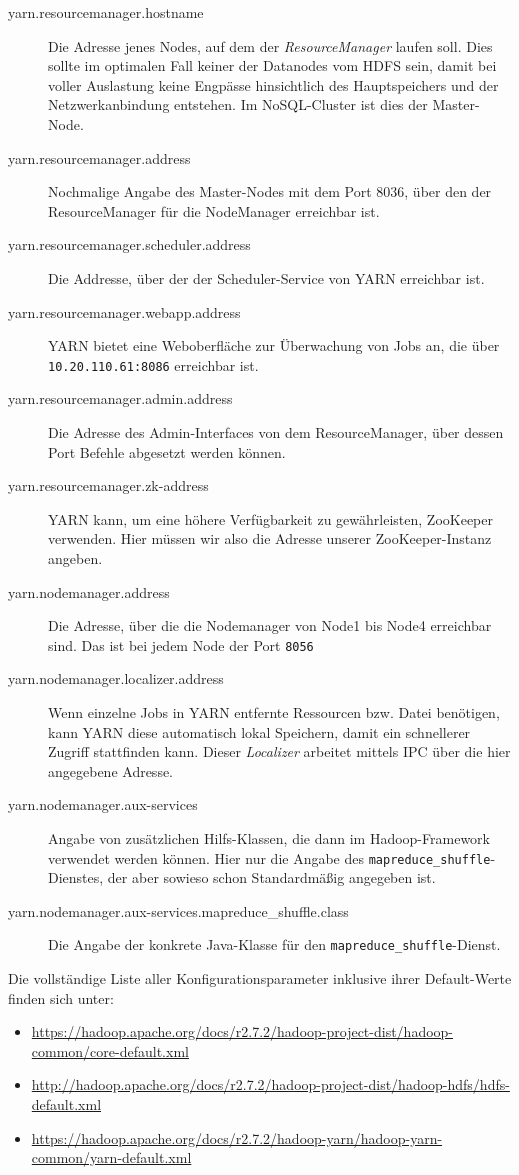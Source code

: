 \begin{description}
	\item[yarn.resourcemanager.hostname] Die Adresse jenes Nodes, auf dem der \textit{ResourceManager} laufen soll.
	Dies sollte im optimalen Fall keiner der Datanodes vom HDFS sein, damit bei voller Auslastung keine Engpässe hinsichtlich
	des Hauptspeichers und der Netzwerkanbindung entstehen. Im NoSQL-Cluster ist dies der Master-Node.
	\item[yarn.resourcemanager.address] Nochmalige Angabe des Master-Nodes mit dem Port 8036, über den der
	ResourceManager für die NodeManager erreichbar ist.
	\item[yarn.resourcemanager.scheduler.address] Die Addresse, über der der Scheduler-Service von YARN erreichbar ist.
	\item[yarn.resourcemanager.webapp.address] YARN bietet eine Weboberfläche zur Überwachung von Jobs an, die über \texttt{10.20.110.61:8086} 
	erreichbar ist.
	\item[yarn.resourcemanager.admin.address] Die Adresse des Admin-Interfaces von dem ResourceManager, über dessen Port Befehle abgesetzt werden können.
	\item[yarn.resourcemanager.zk-address] YARN kann, um eine höhere Verfügbarkeit zu gewährleisten, ZooKeeper verwenden. Hier müssen wir also die Adresse unserer
	ZooKeeper-Instanz angeben.
	\item[yarn.nodemanager.address] Die Adresse, über die die Nodemanager von Node1 bis Node4 erreichbar sind. Das ist bei jedem Node der Port \texttt{8056}
	\item[yarn.nodemanager.localizer.address] Wenn einzelne Jobs in YARN entfernte Ressourcen bzw. Datei benötigen, kann YARN diese automatisch lokal Speichern,
	damit ein schnellerer Zugriff stattfinden kann. Dieser \textit{Localizer} arbeitet mittels IPC über die hier angegebene Adresse.
	\item[yarn.nodemanager.aux-services] Angabe von zusätzlichen Hilfs-Klassen, die dann im Hadoop-Framework verwendet werden können. Hier nur die Angabe des \texttt{mapreduce\_shuffle}-Dienstes, der aber sowieso schon Standardmäßig angegeben ist.
	\item[yarn.nodemanager.aux-services.mapreduce\_shuffle.class] Die Angabe der konkrete Java-Klasse für den \texttt{mapreduce\_shuffle}-Dienst.
\end{description}

Die vollständige Liste aller Konfigurationsparameter inklusive ihrer Default-Werte finden sich unter:

\begin{itemize}
	\item \url{https://hadoop.apache.org/docs/r2.7.2/hadoop-project-dist/hadoop-common/core-default.xml}
	\item \url{http://hadoop.apache.org/docs/r2.7.2/hadoop-project-dist/hadoop-hdfs/hdfs-default.xml}
	\item \url{https://hadoop.apache.org/docs/r2.7.2/hadoop-yarn/hadoop-yarn-common/yarn-default.xml}
\end{itemize}